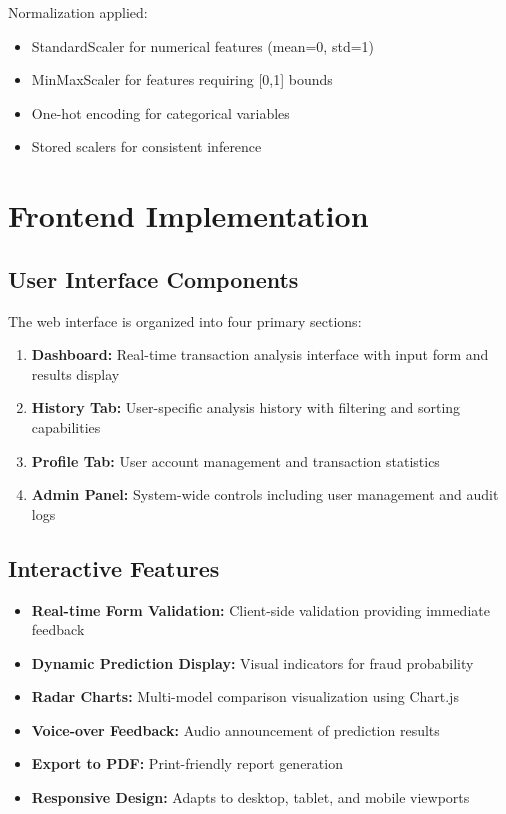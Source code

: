 \documentclass[12pt,a4paper,twoside]{report}
\begin{document}
Normalization applied:

\begin{itemize}
    \item StandardScaler for numerical features (mean=0, std=1)
    \item MinMaxScaler for features requiring [0,1] bounds
    \item One-hot encoding for categorical variables
    \item Stored scalers for consistent inference
\end{itemize}

\section{Frontend Implementation}

\subsection{User Interface Components}

The web interface is organized into four primary sections:

\begin{enumerate}
    \item \textbf{Dashboard:} Real-time transaction analysis interface with input form and results display
    \item \textbf{History Tab:} User-specific analysis history with filtering and sorting capabilities
    \item \textbf{Profile Tab:} User account management and transaction statistics
    \item \textbf{Admin Panel:} System-wide controls including user management and audit logs
\end{enumerate}

\subsection{Interactive Features}

\begin{itemize}
    \item \textbf{Real-time Form Validation:} Client-side validation providing immediate feedback
    \item \textbf{Dynamic Prediction Display:} Visual indicators for fraud probability
    \item \textbf{Radar Charts:} Multi-model comparison visualization using Chart.js
    \item \textbf{Voice-over Feedback:} Audio announcement of prediction results
    \item \textbf{Export to PDF:} Print-friendly report generation
    \item \textbf{Responsive Design:} Adapts to desktop, tablet, and mobile viewports
\end{itemize}
\end{document}
